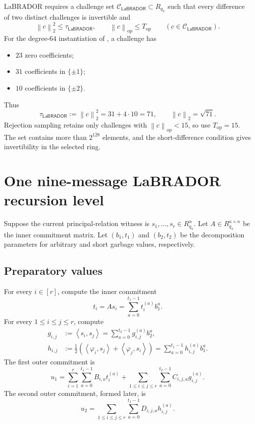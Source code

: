 \documentclass[11pt,a4paper]{article}
\newcommand{\Rpi}{R_{q_{\pi}}}
\newcommand{\LaB}{\mathsf{LaBRADOR}}
\newcommand{\op}{\operatorname{op}}
\newcommand{\norm}[1]{\left\lVert #1\right\rVert}
\newcommand{\inner}[2]{\left\langle #1,#2\right\rangle}
\newcommand{\calC}{\mathcal{C}}
\begin{document}
LaBRADOR requires a challenge set \(\calC_{\LaB}\subset\Rpi\) such that every
difference of two distinct challenges is invertible and
\begin{equation}
  \norm{c}_2^2\le\tau_{\LaB},
  \qquad
  \norm{c}_{\op}\le T_{\op}
  \qquad(c\in\calC_{\LaB}).
  \label{eq:LaB-challenge-bounds}
\end{equation}
For the degree-\(64\) instantiation of \cite{BS23}, a challenge has
\begin{itemize}
  \item \(23\) zero coefficients;
  \item \(31\) coefficients in \(\{\pm1\}\);
  \item \(10\) coefficients in \(\{\pm2\}\).
\end{itemize}
Thus
\[
  \tau_{\LaB}:=\norm{c}_2^2=31+4\cdot10=71,
  \qquad \norm{c}_2=\sqrt{71}.
\]
Rejection sampling retains only challenges with \(\norm{c}_{\op}<15\), so use
\(T_{\op}=15\).  The set contains more than \(2^{128}\) elements, and the
short-difference condition gives invertibility in the selected ring.

\section{One nine-message LaBRADOR recursion level}

Suppose the current principal-relation witness is
\(s_1,\ldots,s_r\in\Rpi^n\).  Let
\(A\in\Rpi^{\kappa\times n}\) be the inner commitment matrix.  Let
\((b_1,t_1)\) and \((b_2,t_2)\) be the decomposition parameters for arbitrary
and short garbage values, respectively.

\subsection{Preparatory values}

For every \(i\in[r]\), compute the inner commitment
\[
  t_i=As_i
    =\sum_{a=0}^{t_1-1}t_i^{(a)}b_1^a.
\]
For every \(1\le i\le j\le r\), compute
\begin{align*}
 g_{i,j}&:=\inner{s_i}{s_j}
        =\sum_{a=0}^{t_2-1}g_{i,j}^{(a)}b_2^a,\\
 h_{i,j}&:=\frac12\left(
          \inner{\varphi_i}{s_j}+\inner{\varphi_j}{s_i}
        \right)
        =\sum_{a=0}^{t_1-1}h_{i,j}^{(a)}b_1^a.
\end{align*}
The first outer commitment is
\begin{equation}
 u_1=
 \sum_{i=1}^{r}\sum_{a=0}^{t_1-1}B_{i,a}t_i^{(a)}
 +\sum_{1\le i\le j\le r}\sum_{a=0}^{t_2-1}C_{i,j,a}g_{i,j}^{(a)}.
 \label{eq:LaB-u1}
\end{equation}
The second outer commitment, formed later, is
\begin{equation}
 u_2=
 \sum_{1\le i\le j\le r}\sum_{a=0}^{t_1-1}D_{i,j,a}h_{i,j}^{(a)}.
 \label{eq:LaB-u2}
\end{equation}
\end{document}

